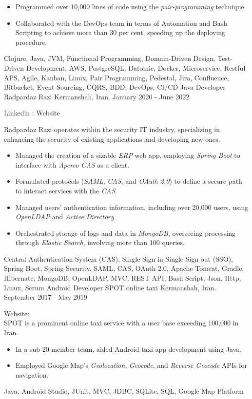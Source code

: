 \begin{experiences}
{\begin{itemize}
  \item Programmed over 10,000 lines of code using the \emph{pair-programming} technique.
  \item Collaborated with the DevOps team in terms of Automation and Bash Scripting to achieve more than 30 per cent, speeding up the deploying procedure.
  \end{itemize}}{Clojure, Java, JVM, Functional Programming, Domain-Driven Design, Test-Driven Development, AWS, PostgreSQL, Datomic, Docker, Microservice, Restful APS, Agile, Kanban, Linux, Pair Programming, Pedestal, Jira, Confluence, Bitbucket, Event Sourcing, CQRS, BDD, DevOps, CI/CD}
 \emptySeparator
\experience
{}
{Java Developer}
{Radpardaz Razi}
{Kermanshah, Iran. \hspace{170 pt} January 2020 - June 2022}
{}
{
Linkedin : 
Website 
\par{Radpardaz Razi operates within the security IT industry, specializing in enhancing the security of existing applications and developing new ones.}
\begin{itemize}
\item Managed the creation of a sizable \emph{ERP} web app, employing \emph{Spring Boot} to interface with \emph{Apereo CAS} as a client.
\item Formulated protocols (\emph{SAML}, \emph{CAS}, and \emph{OAuth 2.0}) to define a secure path to interact services with the \textit{CAS}.
\item Managed users' authentication information, including over 20,000 users, using \emph{OpenLDAP} and \emph{Active Directory}
\item Orchestrated storage of logs and data in \emph{MongoDB}, overseeing processing through \emph{Elastic Search}, involving more than 100 queries.
\end{itemize}
}{Central Authentication System (CAS), Single Sign in Single Sign out (SSO), Spring Boot, Spring Security, SAML, CAS, OAuth 2.0, Apache Tomcat, Gradle, Hibernate, MongoDB, OpenLDAP, MVC, REST API, Bash Script, Json, Http, Linux, Scrum}
\emptySeparator
\experience
  {}
  {Android Developer}
  {SPOT online taxi}
  {Kermanshah, Iran. \hspace{140 pt} September 2017 - May 2019}
  {}
  {
  Website: \\
  SPOT is a prominent online taxi service with a user base exceeding 100,000 in Iran. 
  \begin{itemize}
    \item In a sub-20 member team, aided Android taxi app development using Java.
    \item Employed Google Map's \emph{Geolocation}, \emph{Geocode}, and \emph{Reverse Geocode} APIs for navigation.\end{itemize}
  }{Java, Android Studio, JUnit, MVC, JDBC, SQLite, SQL, Google Map Platform}


\end{experiences}
